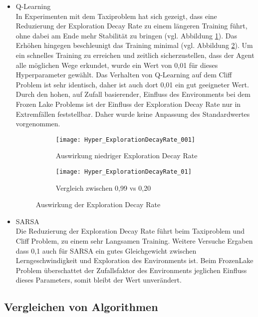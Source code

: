 \begin{itemize}
  \item Q-Learning\\
  In Experimenten mit dem Taxiproblem hat sich gezeigt, dass eine Reduzierung der Exploration Decay Rate zu einem längeren Training führt, ohne dabei am Ende mehr Stabilität zu bringen (vgl. Abbildung \ref{fig:ExplorationDecayRate_low}).
  Das Erhöhen hingegen beschleunigt das Training minimal (vgl. Abbildung \ref{fig:ExplorationDecayRate_high}).
  Um ein schnelles Training zu erreichen und zeitlich sicherzustellen, dass der Agent alle möglichen Wege erkundet, wurde ein Wert von 0,01 für dieses Hyperparameter gewählt.
  Das Verhalten von Q-Learning auf dem Cliff Problem ist sehr identisch, daher ist auch dort 0,01 ein gut geeigneter Wert.
  Durch den hohen, auf Zufall basierender, Einfluss des Environments bei dem Frozen Lake Problems ist der Einfluss der Exploration Decay Rate nur in Extremfällen feststellbar.
  Daher wurde keine Anpassung des Standardwertes vorgenommen.
  \begin{figure}[H]
    \centering
    \begin{subfigure}{.5\textwidth}
      \centering
      \texttt{[image: Hyper\_ExplorationDecayRate\_001]}
      \caption{Auswirkung niedriger Exploration Decay Rate}
      \label{fig:ExplorationDecayRate_low}
    \end{subfigure}%
    \begin{subfigure}{.5\textwidth}
      \centering
      \texttt{[image: Hyper\_ExplorationDecayRate\_01]}
      \caption{Vergleich zwischen 0,99 vs 0,20}
      \label{fig:ExplorationDecayRate_high}
    \end{subfigure}
    \caption{Auswirkung der Exploration Decay Rate}
    \label{fig:ExplorationDecayRate_Q-Learning}
  \end{figure}
  \item SARSA\\
  Die Reduzierung der Exploration Decay Rate führt beim Taxiproblem und Cliff Problem, zu einem sehr Langsamen Training.
  Weitere Versuche Ergaben dass 0,1 auch für SARSA ein gutes Gleichgewicht zwischen Lerngeschwindigkeit und Exploration des Environments ist.
  Beim FrozenLake Problem überschattet der Zufallsfaktor des Environments jeglichen Einfluss dieses Parameters, somit bleibt der Wert unverändert.

\end{itemize}

\subsection{Vergleichen von Algorithmen}

